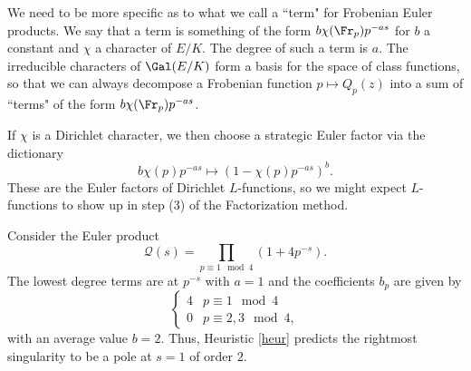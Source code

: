\documentclass[12pt]{amsart}
\newenvironment{BOXexample}{
\begin{exbox}\mbox{}
\begin{example}
}
{
\end{example}
\end{exbox}
}
\theoremstyle{plain}
\begin{document}
We need to be more specific as to what we call a ``term" for Frobenian Euler products. We say that a term is something of the form $b \chi(\Fr_p)p^{-as}$ for $b$ a constant and $\chi$ a character of $E/K$. The degree of such a term is $a$. The irreducible characters of $\Gal(E/K)$ form a basis for the space of class functions, so that we can always decompose a Frobenian function $p\mapsto Q_p(z)$ into a sum of ``terms" of the form $b\chi(\Fr_p)p^{-as}$.

If $\chi$ is a Dirichlet character, we then choose a strategic Euler factor via the dictionary
\[
b \chi(p)p^{-as} \longmapsto (1 - \chi(p)p^{-as})^b.
\]
These are the Euler factors of Dirichlet $L$-functions, so we might expect $L$-functions to show up in step (3) of the Factorization method.

\begin{BOXexample}\label{ex:dirichlet_L_factor}
Consider the Euler product
\[
\mathcal{Q}(s) = \prod_{p\equiv 1 \mod 4} (1 + 4p^{-s}).
\]
The lowest degree terms are at $p^{-s}$ with $a=1$ and the coefficients $b_p$ are given by
\[
\begin{cases}
4 & p\equiv 1 \mod 4\\
0 & p\equiv 2,3 \mod 4,
\end{cases}
\]
with an average value $b = 2$. Thus, Heuristic \ref{heur} predicts the rightmost singularity to be a pole at $s=1$ of order $2$.


\end{BOXexample}
\end{document}
